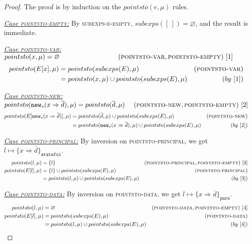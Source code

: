\documentclass{llncs}
\newcommand{\keywadj}[1]{\mathtt{#1}}
\begin{document}
\begin{proof} The proof is by induction on the $pointsto(e, \mu)$ rules.

\noindent\underline{\textit{Case \textsc{pointsto-empty}:}} By \textsc{subexps-e-empty}, $subexps([~]) = \varnothing$, and the result is immediate.

\noindent\underline{\textit{Case \textsc{pointsto-var}:}} $pointsto(x, \mu) = \varnothing~~~~~~~~~~~~~~~~~~~~~~~~~~(\textsc{pointsto-var}, \textsc{pointsto-empty})~[1]$
\vspace{-7pt}
\begin{align*}
pointsto(E[x], \mu) &= pointsto(subexps(E), \mu) & (\textsc{pointsto-var})\\
&= pointsto(x, \mu) \cup pointsto(subexps(E), \mu) & (by~[1])
\end{align*}

\noindent\underline{\textit{Case \textsc{pointsto-new}:}} $pointsto(\keywadj{new}_s(x \Rightarrow \overline{d}), \mu) = pointsto(\overline{d}, \mu)~~~~(\textsc{pointsto-new}, \textsc{pointsto-empty})~[2]$
\vspace{-7pt}
\begin{align*}
pointsto(E[\keywadj{new}_s(x \Rightarrow \overline{d})], \mu) &= pointsto(\overline{d}, \mu) \cup pointsto(subexps(E), \mu) & (\textsc{pointsto-new})\\
&= pointsto(\keywadj{new}_s(x \Rightarrow \overline{d}), \mu) \cup pointsto(subexps(E), \mu) & (by~[2])
\end{align*}

\noindent\underline{\textit{Case \textsc{pointsto-principal}:}} By inversion on \textsc{pointsto-principal}, we get $l \mapsto \{ x \Rightarrow \overline{d} \}_{\keywadj{stateful}}$.
\vspace{-7pt}
\begin{align*}
pointsto(l, \mu) &= \{ l \} & (\textsc{pointsto-principal}, \textsc{pointsto-empty})~[3]\\
pointsto(E[l], \mu) &= \{ l \} \cup pointsto(subexps(E), \mu) & (\textsc{pointsto-principal})\\
&= pointsto(l, \mu) \cup pointsto(subexps(E), \mu) & (by~[3])
\end{align*}

\noindent\underline{\textit{Case \textsc{pointsto-data}:}} By inversion on \textsc{pointsto-data}, we get $l \mapsto \{ x \Rightarrow \overline{d} \}_{\keywadj{pure}}$.
\vspace{-7pt}
\begin{align*}
pointsto(l, \mu) &= \varnothing & (\textsc{pointsto-data}, \textsc{pointsto-empty})~[4]\\
pointsto(E[l], \mu) &= pointsto(subexps(E), \mu) & (\textsc{pointsto-data})\\
&= pointsto(l, \mu) \cup pointsto(subexps(E), \mu) & (by~[4])
\end{align*}


\end{proof}
\end{document}
